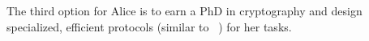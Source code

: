 The third option for Alice is to earn a PhD in cryptography and design
specialized, efficient \mpc protocols (similar to
~\cite{shafindss,wu,minionn}) for her tasks.









